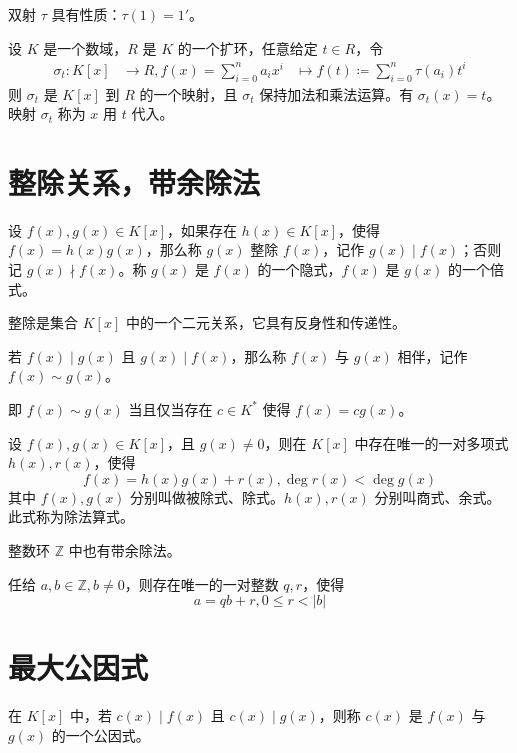 双射 $\tau$ 具有性质：$\tau(1) = 1'$。

\begin{theorem}
	设 $K$ 是一个数域，$R$ 是 $K$ 的一个扩环，任意给定 $t\in R$，令
	\[
		\begin{aligned}
			\sigma_t : K[x] & \to R, f(x) = \sum_{i=0}^n a_ix^i & \mapsto f(t) \coloneqq  \sum_{i=0}^n \tau(a_i)t^i
		\end{aligned}
	\]
	则 $\sigma_t$ 是 $K[x]$ 到 $R$ 的一个映射，且 $\sigma_t$ 保持加法和乘法运算。有 $\sigma_t(x) = t$。映射 $\sigma_t$ 称为 $x$ 用 $t$ 代入。
\end{theorem}

\section{整除关系，带余除法}

设 $f(x), g(x) \in K[x]$，如果存在 $h(x) \in K[x]$，使得 $f(x) = h(x)g(x)$，那么称 $g(x)$ 整除 $f(x)$，记作 $g(x) \mid f(x)$；否则记 $g(x) \nmid f(x)$。称 $g(x)$ 是 $f(x)$ 的一个隐式，$f(x)$ 是 $g(x)$ 的一个倍式。

整除是集合 $K[x]$ 中的一个二元关系，它具有反身性和传递性。

\begin{definition}
	若 $f(x) \mid g(x)$ 且 $g(x) \mid f(x)$，那么称 $f(x)$ 与 $g(x)$ 相伴，记作 $f(x) \sim g(x)$。
\end{definition}

即 $f(x) \sim g(x)$ 当且仅当存在 $c \in K^*$ 使得 $f(x) = cg(x)$。

\begin{definition}[带余除法]
	设 $f(x), g(x) \in K[x]$，且 $g(x) \ne 0$，则在 $K[x]$ 中存在唯一的一对多项式 $h(x), r(x)$，使得
	\[f(x) = h(x)g(x) + r(x), \deg r(x) < \deg g(x)\]
	其中 $f(x), g(x)$ 分别叫做被除式、除式。$h(x),r(x)$ 分别叫商式、余式。此式称为除法算式。
\end{definition}

整数环 $\mathbb{Z}$ 中也有带余除法。

\begin{theorem}
	任给 $a,b\in \mathbb{Z}, b\ne 0$，则存在唯一的一对整数 $q,r$，使得
	\[a = qb + r, 0 \leqslant r < |b|\]
\end{theorem}

\section{最大公因式}

在 $K[x]$ 中，若 $c(x) \mid f(x)$ 且 $c(x) \mid g(x)$，则称 $c(x)$ 是 $f(x)$ 与 $g(x)$ 的一个公因式。

